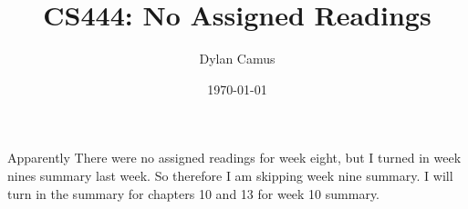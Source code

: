 \documentclass[letterpaper,10pt]{article}
\title{CS444: No Assigned Readings}
\author{Dylan Camus}
\date{\today}
\begin{document}
\maketitle
Apparently There were no assigned readings for week eight, but I turned in week nines summary last week. So therefore I am skipping week nine summary. I will turn in the summary for chapters 10 and 13 for week 10 summary.
\end{document}
